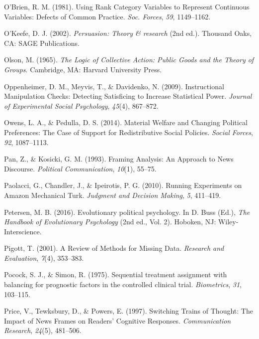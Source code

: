 \documentclass[12pt,econ]{sources/authesis}
\begin{document}
\leavevmode\hypertarget{ref-obrien_1981_using}{}%
O'Brien, R. M. (1981). Using Rank Category Variables to Represent Continuous Variables: Defects of Common Practice. \emph{Soc. Forces}, \emph{59}, 1149--1162.

\leavevmode\hypertarget{ref-okeefe_2002_persuasion}{}%
O'Keefe, D. J. (2002). \emph{Persuasion: Theory \& research} (2nd ed.). Thousand Oaks, CA: SAGE Publications.

\leavevmode\hypertarget{ref-olson_logic_1965}{}%
Olson, M. (1965). \emph{The Logic of Collective Action: Public Goods and the Theory of Groups}. Cambridge, MA: Harvard University Press.

\leavevmode\hypertarget{ref-oppenheimer_2009_instructional}{}%
Oppenheimer, D. M., Meyvis, T., \& Davidenko, N. (2009). Instructional Manipulation Checks: Detecting Satisficing to Increase Statistical Power. \emph{Journal of Experimental Social Psychology}, \emph{45}(4), 867--872.

\leavevmode\hypertarget{ref-owens_2014_material}{}%
Owens, L. A., \& Pedulla, D. S. (2014). Material Welfare and Changing Political Preferences: The Case of Support for Redistributive Social Policies. \emph{Social Forces}, \emph{92}, 1087--1113.

\leavevmode\hypertarget{ref-pan_framing_1993}{}%
Pan, Z., \& Kosicki, G. M. (1993). Framing Analysis: An Approach to News Discourse. \emph{Political Communication}, \emph{10}(1), 55--75.

\leavevmode\hypertarget{ref-paolacci_2010_running}{}%
Paolacci, G., Chandler, J., \& Ipeirotis, P. G. (2010). Running Experiments on Amazon Mechanical Turk. \emph{Judgment and Decision Making}, \emph{5}, 411--419.

\leavevmode\hypertarget{ref-petersen_2016_evolutionary}{}%
Petersen, M. B. (2016). Evolutionary political psychology. In D. Buss (Ed.), \emph{The Handbook of Evolutionary Psychology} (2nd ed., Vol. 2). Hoboken, NJ: Wiley-Interscience.

\leavevmode\hypertarget{ref-pigott_review_2001}{}%
Pigott, T. (2001). A Review of Methods for Missing Data. \emph{Research and Evaluation}, \emph{7}(4), 353--383.

\leavevmode\hypertarget{ref-pocock_1975_sequential}{}%
Pocock, S. J., \& Simon, R. (1975). Sequential treatment assignment with balancing for prognostic factors in the controlled clinical trial. \emph{Biometrics}, \emph{31}, 103--115.

\leavevmode\hypertarget{ref-price_switching_1997}{}%
Price, V., Tewksbury, D., \& Powers, E. (1997). Switching Trains of Thought: The Impact of News Frames on Readers' Cognitive Responses. \emph{Communication Research}, \emph{24}(5), 481--506.
\end{document}
